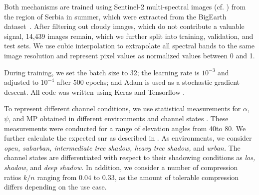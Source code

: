 \documentclass[conference]{IEEEtran}
\newcommand\MP{\ensuremath{\mathrm{MP}}\xspace}
\newcommand\sentinelii{Sentinel-2\xspace}
\begin{document}
Both mechanisms are trained using \sentinelii multi-spectral images (cf. ) from the region of Serbia in summer, which were extracted from the BigEarth dataset~\cite{sumbul2019bigearthnet,Sumbul2021}.
After filtering out cloudy images, which do not contribute a valuable signal, 14,439 images remain, which we further split into training, validation, and test sets.
We use cubic interpolation to extrapolate all spectral bands to the same image resolution and represent pixel values as normalized values between 0 and 1.

During training, we set the batch size to 32; the learning rate is $10^{-3}$ and adjusted to $10^{-4}$ after 500 epochs; and Adam is used as a stochastic gradient descent.
All code was written using Keras \cite{keras} and Tensorflow \cite{tensorflow}.

To represent different channel conditions, we use statistical measurements for $\alpha$, $\psi$, and \MP obtained in different environments and channel states \cite{channel-params}.
These measurements were conducted for a range of elevation angles from 40\textdegree to 80\textdegree.
We further calculate the expected \ac{snr} as described in .
As environments, we consider \emph{open, suburban, intermediate tree shadow, heavy tree shadow,} and \emph{urban.}
The channel states are differentiated with respect to their shadowing conditions as \emph{\acf{los}, shadow,} and \emph{deep shadow.}
In addition, we consider a number of compression ratios $k/n$ ranging from $0.04$ to $0.33$, as the amount of tolerable compression differs depending on the use case.
\end{document}

